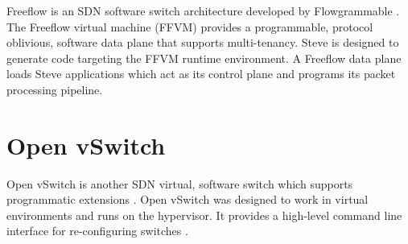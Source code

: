 Freeflow is an SDN software switch architecture developed
by Flowgrammable \cite{freeflow_software}. The Freeflow virtual machine (FFVM) 
provides a programmable, protocol oblivious, software data plane that 
supports multi-tenancy. Steve is
designed to generate code targeting the FFVM runtime environment. A Freeflow data 
plane loads Steve applications which act as its control plane and programs its packet processing pipeline.

\section{Open vSwitch}
\label{rel:vswitch}

Open vSwitch is another SDN virtual, software switch which supports programmatic extensions \cite{ovs_man_page, ovs2009extending, ovs2013}. Open vSwitch was designed to work in virtual environments and runs on the hypervisor. It provides a high-level command line interface for re-configuring switches \cite{ovs_man_page}.


